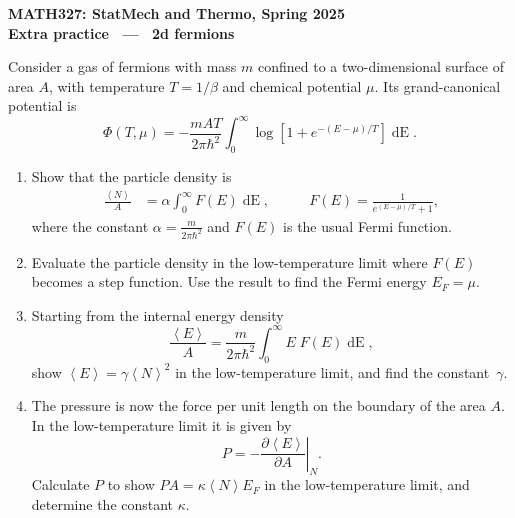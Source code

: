 \documentclass[12 pt]{article} %
\newcommand{\al}{\ensuremath{\alpha} }
\newcommand{\be}{\ensuremath{\beta} }
\newcommand{\ga}{\ensuremath{\gamma} }
\newcommand{\ka}{\ensuremath{\kappa} }
\renewcommand{\d}[1]{\ensuremath{\mathop{d#1}} }
\newcommand{\vev}[1]{\ensuremath{\left\langle #1 \right\rangle} }
\begin{document}
\newcommand{\thisunit}{MATH327 Extra (2d fermions)}
\newcommand{\moddate}{Last modified 12 May 2025}
\begin{center}
  {\Large \textbf{MATH327: StatMech and Thermo, Spring 2025}} \\[12 pt]
  {\Large \textbf{Extra practice \ --- \ 2d fermions}} \\[24 pt]
\end{center}

Consider a gas of fermions with mass $m$ confined to a two-dimensional surface of area $A$, with temperature $T = 1 / \be$ and chemical potential $\mu$.
Its grand-canonical potential is
\begin{equation*}
  \Phi(T, \mu) = -\frac{mAT}{2\pi\hbar^2} \int_0^{\infty} \log\left[1 + e^{-(E - \mu) / T}\right] \d{E}.
\end{equation*}

\begin{enumerate}[label={(\alph*)}]
  \item Show that the particle density is
        \begin{align*}
          \frac{\vev{N}}{A} & = \al \int_0^{\infty} F(E) \d{E}, \qquad &
          F(E) = \frac{1}{e^{(E - \mu) / T} + 1},
        \end{align*}
        where the constant $\al = \frac{m}{2\pi\hbar^2}$ and $F(E)$ is the usual Fermi function.

  \item Evaluate the particle density in the low-temperature limit where $F(E)$ becomes a step function.
        Use the result to find the Fermi energy $E_F = \mu$.

  \item Starting from the internal energy density
        \begin{equation*}
          \frac{\vev{E}}{A} = \frac{m}{2\pi\hbar^2} \int_0^{\infty} E \; F(E) \d{E},
        \end{equation*}
        show $\vev{E} = \ga \vev{N}^2$ in the low-temperature limit, and find the constant~$\ga$.

  \item The pressure is now the force per unit length on the boundary of the area $A$.
        In the low-temperature limit it is given by
        \begin{equation*}
          P = -\left. \frac{\partial \!\vev{E}}{\partial A}\right|_N.
        \end{equation*}
        Calculate $P$ to show $P A = \ka \vev{N} E_F$ in the low-temperature limit, and determine the constant $\ka$.
\end{enumerate}
\end{document}
